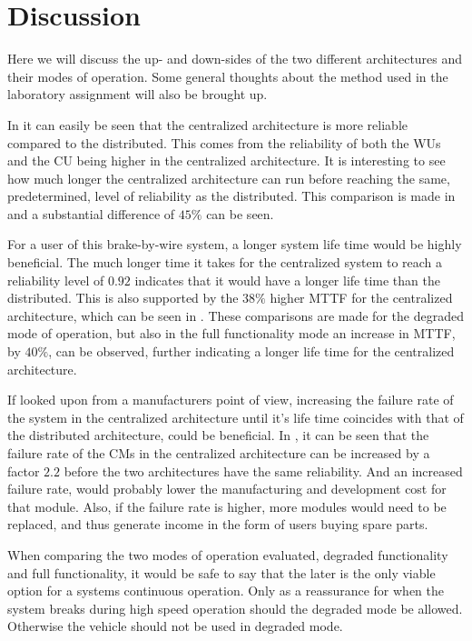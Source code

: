 \newpage
\section{Discussion}
\label{S5}
Here we will discuss the up- and down-sides of the two different architectures and their modes of operation. Some general thoughts about the method used in the laboratory assignment will also be brought up.

In  it can easily be seen that the centralized architecture is more reliable compared to the distributed. This comes from the reliability of both the WUs and the CU being higher in the centralized architecture. It is interesting to see how much longer the centralized architecture can run before reaching the same, predetermined, level of reliability as the distributed. This comparison is made in  and a substantial difference of $45\%$ can be seen. 

For a user of this brake-by-wire system, a longer system life time would be highly beneficial. The much longer time it takes for the centralized system to reach a reliability level of $0.92$ indicates that it would have a longer life time than the distributed. This is also supported by the $38\%$ higher MTTF for the centralized architecture, which can be seen in . These comparisons are made for the degraded mode of operation, but also in the full functionality mode an increase in MTTF, by $40\%$, can be observed, further indicating a longer life time for the centralized architecture.   

If looked upon from a manufacturers point of view, increasing the failure rate of the system in the centralized architecture until it's life time coincides with that of the distributed architecture, could be beneficial. In , it can be seen that the failure rate of the CMs in the centralized architecture can be increased by a factor $2.2$ before the two architectures have the same reliability. And an increased failure rate, would probably lower the manufacturing and development cost for that module. Also, if the failure rate is higher, more modules would need to be replaced, and thus generate income in the form of users buying spare parts. 

When comparing the two modes of operation evaluated, degraded functionality and full functionality, it would be safe to say that the later is the only viable option for a systems continuous operation. Only as a reassurance for when the system breaks during high speed operation should the degraded mode be allowed. Otherwise the vehicle  should not be used in degraded mode.

